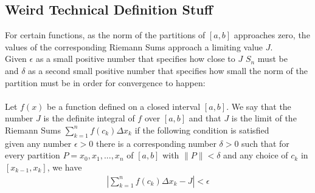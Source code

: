 \documentclass{article}
\newcommand\regsum{\sum_{k=1}^{n}}
\begin{document}
    \subsection{Weird Technical Definition Stuff}
        For certain functions, as the norm of the partitions of \([a, b]\) approaches zero, the values of the corresponding Riemann Sums approach a limiting value \(J\).\\
        Given \(\epsilon\) as a small positive number that specifies how close to \(J\) \(S_n\) must be\\
        and \(\delta\) as a second small positive number that specifies how small the norm of the partition must be in order for convergence to happen:\\
        \\
        Let \(f(x)\) be a function defined on a closed interval \([a, b]\). We say that the number \(J\) is the definite integral of \(f\) over \([a, b]\) and that \(J\) is the limit of the Riemann Sums \(\regsum f(c_k)\Delta x_k\) if the following condition is satisfied\\
        given any number \(\epsilon > 0\) there is a corresponding number \(\delta > 0\) such that for every partition \(P = {x_0, x_1, ..., x_n}\) of \([a, b]\) with \(\|P\| < \delta\) and any choice of \(c_k\) in \([x_{k-1}, x_k]\), we have
        \begin{gather*}
            \left|\regsum f(c_k)\Delta x_k - J\right|<    \epsilon
        \end{gather*}
    
\end{document}
